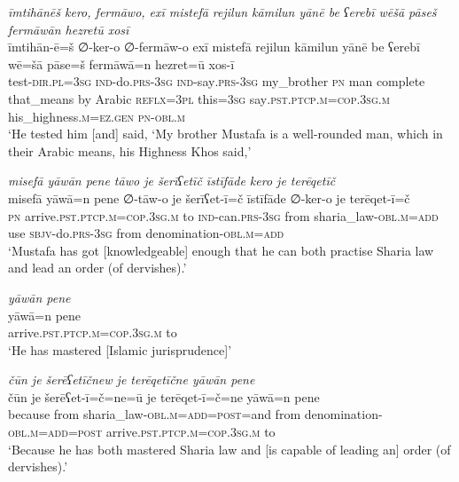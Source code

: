 \ea \label{ŽP.83}
\textit{īmtihānēš kero, fermāwo, exī mistefā rejilun kāmilun yānē be ʕerebī wēšā pāseš fermāwān hezretū xosī} \\ 
\gll īmtihān-ē=š ∅-ker-o ∅-fermāw-o exī mistefā rejilun kāmilun yānē be ʕerebī wē=šā pāse=š fermāwā=n hezret=ū xos-ī \\ 
 test\textsc{-dir}\textsc{.pl}\textsc{=3sg} \textsc{ind-}do\textsc{.prs}\textsc{-3sg} \textsc{ind-}say\textsc{.prs}\textsc{-3sg} my\_brother \textsc{pn} man complete that\_means by Arabic \textsc{reflx}\textsc{=3pl} this\textsc{=3sg} say\textsc{.pst}\textsc{.ptcp}\textsc{.m}\textsc{=cop}\textsc{.3sg}\textsc{.m} his\_highness\textsc{.m}\textsc{\textsc{=ez.gen}} \textsc{pn}\textsc{-obl}\textsc{.m} \\ 
\glt `He tested him [and] said, ‘My brother Mustafa is a well-rounded man, which in their Arabic means, his Highness Khos said,'
\z 
 
\ea \label{ŽP.84}
\textit{misefā yāwān pene tāwo je šerīʕetīč īstīfāde kero je terēqetīč} \\ 
\gll misefā yāwā=n pene ∅-tāw-o je šerīʕet-ī=č īstīfāde ∅-ker-o je terēqet-ī=č \\ 
 \textsc{pn} arrive\textsc{.pst}\textsc{.ptcp}\textsc{.m}\textsc{=cop}\textsc{.3sg}\textsc{.m} to \textsc{ind-}can\textsc{.prs}\textsc{-3sg} from sharia\_law\textsc{-obl}\textsc{.m}\textsc{=add} use \textsc{sbjv-}do\textsc{.prs}\textsc{-3sg} from denomination\textsc{-obl}\textsc{.m}\textsc{=add} \\ 
\glt `Mustafa has got [knowledgeable] enough that he can both practise Sharia law and lead an order (of dervishes).'
\z 
 
\ea \label{ŽP.85}
\textit{yāwān pene} \\ 
\gll yāwā=n pene \\ 
 arrive\textsc{.pst}\textsc{.ptcp}\textsc{.m}\textsc{=cop}\textsc{.3sg}\textsc{.m} to \\ 
\glt `He has mastered [Islamic jurisprudence]'
\z 
 
\ea \label{ŽP.88}
\textit{čūn je šerēʕetīčnew je terēqetīčne yāwān pene} \\ 
\gll čūn je šerēʕet-ī=č=ne=ū je terēqet-ī=č=ne yāwā=n pene \\ 
 because from sharia\_law\textsc{-obl}\textsc{.m}\textsc{=add}\textsc{=\textsc{post}}=and from denomination\textsc{-obl}\textsc{.m}\textsc{=add}\textsc{=\textsc{post}} arrive\textsc{.pst}\textsc{.ptcp}\textsc{.m}\textsc{=cop}\textsc{.3sg}\textsc{.m} to \\ 
\glt `Because he has both mastered Sharia law and [is capable of leading an] order (of dervishes).'
\z 
 
